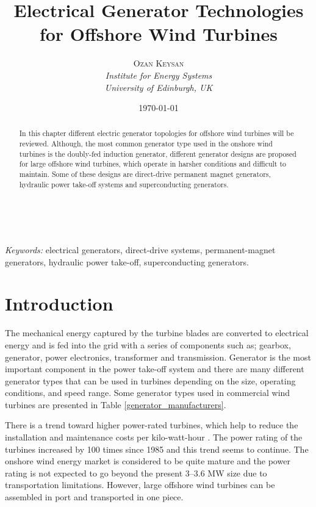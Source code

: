 \documentclass[a4paper, 11pt]{article} %
\title{\textbf{Electrical Generator Technologies for Offshore Wind Turbines}} %
\author{\textsc{Ozan Keysan} %
\\{\textit{Institute for Energy  Systems\\ University of Edinburgh, UK}}} %
\date{\today} %
\makeatletter
\renewcommand{\maketitle}{ %
\begin{flushright} %
{\LARGE\@title} %

\vspace{50pt} %

{\large\@author} %
\\\@date %

\vspace{40pt} %
\end{flushright}
}
\makeatother
\begin{document}
\maketitle %

\begin{abstract}

In this chapter different electric generator topologies for offshore wind turbines will be reviewed. Although, the most common generator type used in the onshore wind turbines is the doubly-fed induction generator, different generator designs are proposed for large offshore wind turbines, which operate in harsher conditions and difficult to maintain. Some of these designs are direct-drive permanent magnet generators, hydraulic power take-off systems and superconducting generators.

\end{abstract}

\hspace*{3,6mm}\textit{Keywords:} electrical generators, direct-drive systems, permanent-magnet generators, hydraulic power take-off, superconducting generators. %

\vspace{30pt} %


\section*{Introduction}

The mechanical energy captured by the turbine blades are converted to electrical energy and is fed into the grid with a series of components such as; gearbox, generator, power electronics, transformer and transmission. Generator is the most important component in the power take-off system and there are many different generator types that can be used in turbines depending on the size, operating conditions, and speed range. Some generator types used in commercial wind turbines are presented in Table \ref{generator_manufacturers}. 

There is a trend toward higher power-rated turbines, which help to reduce the installation and maintenance costs per kilo-watt-hour \cite{Bang2008}. The power rating of the turbines increased by 100 times since 1985 and this trend seems to continue. The onshore wind energy market is considered to be quite mature and the power rating is not expected to go beyond the present 3--3.6 MW size due to transportation limitations. 
However, large offshore wind turbines can be assembled in port and transported in one piece.
\end{document}
